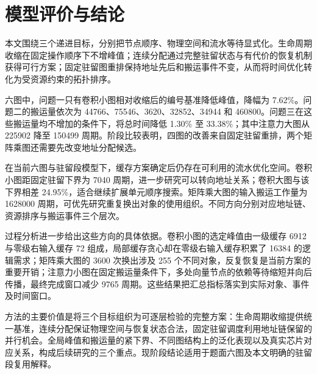 \section{模型评价与结论}
本文围绕三个递进目标，分别把节点顺序、物理空间和流水等待显式化。生命周期收缩在固定操作顺序下不增峰值；连续分配通过完整驻留状态与有代价的恢复机制获得可行方案；固定驻留图重排保持地址先后和搬运事件不变，从而将时间优化转化为受资源约束的拓扑排序。

六图中，问题一只有卷积小图相对收缩后的编号基准降低峰值，降幅为 7.62\%。问题二的搬运量依次为 44766、75546、3620、32852、34944 和 460800。问题三在这些搬运量均不增加的条件下，将总时间降低 1.30\% 至 33.38\%；其中注意力大图从 225902 降至 150499 周期。阶段比较表明，四图的改善来自固定驻留重排，两个矩阵乘图还需要先改变地址分配候选。

在当前六图与驻留段模型下，缓存方案确定后仍存在可利用的流水优化空间。卷积小图距固定驻留下界为 7040 周期，进一步研究可以转向地址关系；卷积大图与该下界相差 24.95\%，适合继续扩展单元顺序搜索。矩阵乘大图的输入搬运工作量为 1628000 周期，可优先研究重复换出对象的使用组织。不同方向分别对应地址链、资源排序与搬运事件三个层次。

过程分析进一步给出这些方向的具体依据。卷积小图的选定峰值由一级缓存 6912 与零级右输入缓存 72 组成，局部缓存贪心却在零级右输入缓存积累了 16384 的逻辑需求；矩阵乘大图的 3600 次换出涉及 255 个不同对象，反复恢复是当前方案的重要开销；注意力小图在固定搬运量条件下，多处向量节点的依赖等待缩短并向后传播，最终完成窗口减少 9765 周期。这些结果把汇总指标落实到实际对象、事件及时间窗口。

方法的主要价值是将三个目标组织为可逐层检验的完整方案：生命周期收缩提供统一基准，连续分配保证物理空间与恢复状态合法，固定驻留调度利用地址链保留的并行机会。全局峰值和搬运量的紧下界、不同图结构上的泛化表现以及真实芯片对应关系，构成后续研究的三个重点。现阶段结论适用于题面六图及本文明确的驻留段复用解释。

